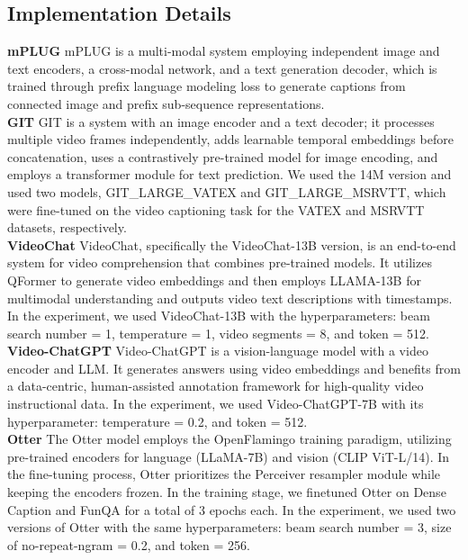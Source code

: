 \subsection{Implementation Details} \label{appendix_d: Exp_result}
\noindent\textbf{mPLUG}\quad
mPLUG is a multi-modal system employing independent image and text encoders, a cross-modal network, and a text generation decoder, which is trained through prefix language modeling loss to generate captions from connected image and prefix sub-sequence representations.\\
\noindent\textbf{GIT}\quad 
GIT is a system with an image encoder and a text decoder; it processes multiple video frames independently, adds learnable temporal embeddings before concatenation, uses a contrastively pre-trained model for image encoding, and employs a transformer module for text prediction. We used the 14M version and used two models, GIT\_LARGE\_VATEX and GIT\_LARGE\_MSRVTT, which were fine-tuned on the video captioning task for the VATEX and MSRVTT datasets, respectively.\\
\noindent\textbf{VideoChat}\quad
VideoChat, specifically the VideoChat-13B version, is an end-to-end system for video comprehension that combines pre-trained models. It utilizes QFormer to generate video embeddings and then employs LLAMA-13B for multimodal understanding and outputs video text descriptions with timestamps. In the experiment, we used VideoChat-13B with the hyperparameters: beam search number = 1, temperature = 1, video segments = 8, and token = 512.\\
\noindent\textbf{Video-ChatGPT}\quad
Video-ChatGPT is a vision-language model with a video encoder and LLM. It generates answers using video embeddings and benefits from a data-centric, human-assisted annotation framework for high-quality video instructional data.
In the experiment, we used Video-ChatGPT-7B with its hyperparameter: temperature = 0.2, and token = 512.\\
\noindent\textbf{Otter}\quad
The Otter model employs the OpenFlamingo training paradigm, utilizing pre-trained encoders for language (LLaMA-7B) and vision (CLIP ViT-L/14). In the fine-tuning process, Otter prioritizes the Perceiver resampler module while keeping the encoders frozen. In the training stage, we finetuned Otter on Dense Caption and FunQA for a total of 3 epochs each. In the experiment, we used two versions of Otter with the same hyperparameters: beam search number = 3,  size of no-repeat-ngram = 0.2, and token = 256.\\
